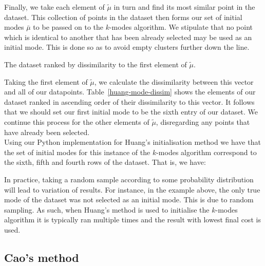 \begin{example}
    Finally, we take each element of \(\tilde{\mu}\) in turn and find its most
    similar point in the dataset. This collection of points in the dataset then
    forms our set of initial modes \(\bar{\mu}\) to be passed on to the 
    \(k\)-modes algorithm. We stipulate that no point which is identical to
    another that has been already selected may be used as an initial mode. This
    is done so as to avoid empty clusters further down the line.\\

    \begin{table}[H]
    \centering
    \resizebox{.8\textwidth}{!}{%
        
    }
    \caption{The dataset ranked by dissimilarity to the first element of
    \(\tilde{\mu}\).}\label{tab:huang-mode-dissim}
    \end{table}

    Taking the first element of \(\tilde{\mu}\), we calculate the dissimilarity
    between this vector and all of our datapoints. Table~\ref{huang-mode-dissim}
    shows the elements of our dataset ranked in ascending order of their
    dissimilarity to this vector. It follows that we should set our first
    initial mode to be the sixth entry of our dataset. We continue this process
    for the other elements of \(\tilde{\mu}\), disregarding any points that have
    already been selected.\\
    
    Using our Python implementation for Huang's initialisation method we have 
    that the set of initial modes for this instance of the \(k\)-modes algorithm
    correspond to the sixth, fifth and fourth rows of the dataset. That is, we
    have:

    
\end{example}

\begin{remark}
    In practice, taking a random sample according to some probability
    distribution will lead to variation of results. For instance, in the example
    above, the only true mode of the dataset was not selected as an initial
    mode. This is due to random sampling. As such, when Huang's method is used
    to initialise the \(k\)-modes algorithm it is typically ran multiple times
    and the result with lowest final cost is used.\\
\end{remark}

\subsection{Cao's method}\label{subsec:cao}

